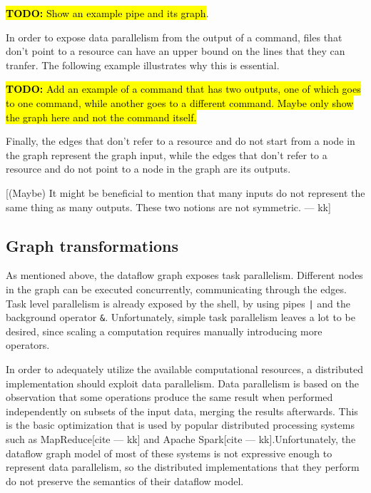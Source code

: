 \documentclass[sigplan,10pt,review,anonymous]{acmart}
\newcommand{\ttt}[1]{\texttt{\small #1}}
\newcommand{\TODO}[1]{\hl{\textbf{TODO:} #1}\xspace}
\newcommand{\kk}[1]{[{\color{magenta}#1 --- kk}]}
\newcommand{\tr}[1]{} %
\begin{document}
\TODO{Show an example pipe and its graph}.

In order to expose data parallelism from the output of a command,
files that don't point to a resource can have an upper bound on the
lines that they can tranfer. The following example illustrates why
this is essential.

\TODO{Add an example of a command that has two outputs, one of which
  goes to one command, while another goes to a different
  command. Maybe only show the graph here and not the command itself.}


\tr{On the other hand, some forms of data parallelism can be exposed
  when knowing the size of the input files. As mentioned in \ref{}
  some pure commands (such as cat -n) only need line information to
  become stateless, and knowing the size of a file could allow the
  system to split it in different chunks that can be processed
  independently. To account for that, edges that refer to an input
  resource contain the number of lines of the file that they refer
  to.}

Finally, the edges that don't refer to a resource and do not start
from a node in the graph represent the graph input, while the edges
that don't refer to a resource and do not point to a node in the graph
are its outputs.

\kk{(Maybe) It might be beneficial to mention that many inputs do not
  represent the same thing as many outputs. These two notions are not
  symmetric.}


\subsection{Graph transformations}
\label{ir:transformations}

As mentioned above, the dataflow graph exposes task
parallelism. Different nodes in the graph can be executed
concurrently, communicating through the edges. Task level parallelism
is already exposed by the shell, by using pipes \ttt{|} and the
background operator \ttt{\&}. Unfortunately, simple task
parallelism leaves a lot to be desired, since scaling a computation
requires manually introducing more operators.

In order to adequately utilize the available computational resources,
a distributed implementation should exploit data parallelism. Data
parallelism is based on the observation that some operations produce
the same result when performed independently on subsets of the input
data, merging the results afterwards. This is the basic optimization
that is used by popular distributed processing systems such as
MapReduce\kk{cite} and Apache Spark\kk{cite}.Unfortunately, the
dataflow graph model of most of these systems is not expressive enough
to represent data parallelism, so the distributed implementations that
they perform do not preserve the semantics of their dataflow model.
\end{document}
